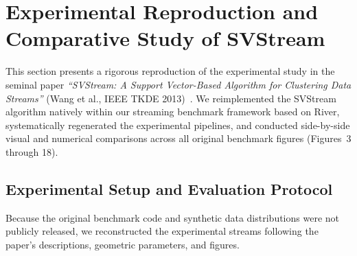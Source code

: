 \section{Experimental Reproduction and Comparative Study of SVStream}
\label{sec:svstream_reproduction}

This section presents a rigorous reproduction of the experimental study in the seminal paper \emph{``SVStream: A Support Vector-Based Algorithm for Clustering Data Streams''} (Wang et al., IEEE TKDE 2013)~\cite{wang2013svstream}. We reimplemented the SVStream algorithm natively within our streaming benchmark framework based on River, systematically regenerated the experimental pipelines, and conducted side-by-side visual and numerical comparisons across all original benchmark figures (Figures~3 through 18).

\subsection{Experimental Setup and Evaluation Protocol}
\label{subsec:svstream_setup}

Because the original benchmark code and synthetic data distributions were not publicly released, we reconstructed the experimental streams following the paper's descriptions, geometric parameters, and figures.

